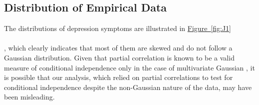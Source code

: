 \documentclass[twoside, 11pt]{article}
\newcommand*{\figref}[2][]{%
  \hyperref[{fig:#2}]{%
    Figure~\ref*{fig:#2}%
    \ifx\\#1\\%
    \else
      #1%
    \fi
  }%
}
\begin{document}
\begin{appendices}

\section{Distribution of Empirical Data}\label{emp-dist}
The distributions of depression symptoms are illustrated in \figref[]{J1}, which clearly indicates that most of them are skewed and do not follow a Gaussian distribution. Given that partial correlation is known to be a valid measure of conditional independence only in the case of multivariate Gaussian \citep{baba_partial_2004}, it is possible that our analysis, which relied on partial correlations to test for conditional independence despite the non-Gaussian nature of the data, may have been misleading.


\end{appendices}
\end{document}
